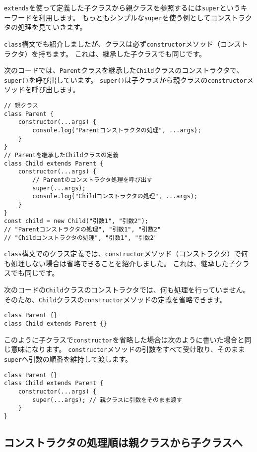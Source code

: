 \texttt{extends}を使って定義した子クラスから親クラスを参照するには\texttt{super}というキーワードを利用します。
もっともシンプルな\texttt{super}を使う例としてコンストラクタの処理を見ていきます。

\texttt{class}構文でも紹介しましたが、クラスは必ず\texttt{constructor}メソッド（コンストラクタ）を持ちます。
これは、継承した子クラスでも同じです。

次のコードでは、\texttt{Parent}クラスを継承した\texttt{Child}クラスのコンストラクタで、\texttt{super()}を呼び出しています。
\texttt{super()}は子クラスから親クラスの\texttt{constructor}メソッドを呼び出します。

\begin{lstlisting}
// 親クラス
class Parent {
    constructor(...args) {
        console.log("Parentコンストラクタの処理", ...args);
    }
}
// Parentを継承したChildクラスの定義
class Child extends Parent {
    constructor(...args) {
        // Parentのコンストラクタ処理を呼び出す
        super(...args);
        console.log("Childコンストラクタの処理", ...args);
    }
}
const child = new Child("引数1", "引数2");
// "Parentコンストラクタの処理", "引数1", "引数2"
// "Childコンストラクタの処理", "引数1", "引数2"
\end{lstlisting}

\texttt{class}構文でのクラス定義では、\texttt{constructor}メソッド（コンストラクタ）で何も処理しない場合は省略できることを紹介しました。
これは、継承した子クラスでも同じです。

次のコードの\texttt{Child}クラスのコンストラクタでは、何も処理を行っていません。
そのため、\texttt{Child}クラスの\texttt{constructor}メソッドの定義を省略できます。

\begin{lstlisting}
class Parent {}
class Child extends Parent {}
\end{lstlisting}

このように子クラスで\texttt{constructor}を省略した場合は次のように書いた場合と同じ意味になります。
\texttt{constructor}メソッドの引数をすべて受け取り、そのまま\texttt{super}へ引数の順番を維持して渡します。

\begin{lstlisting}
class Parent {}
class Child extends Parent {
    constructor(...args) {
        super(...args); // 親クラスに引数をそのまま渡す
    }
}
\end{lstlisting}

\hypertarget{constructor-order}{%
\subsection{コンストラクタの処理順は親クラスから子クラスへ}\label{constructor-order}}


